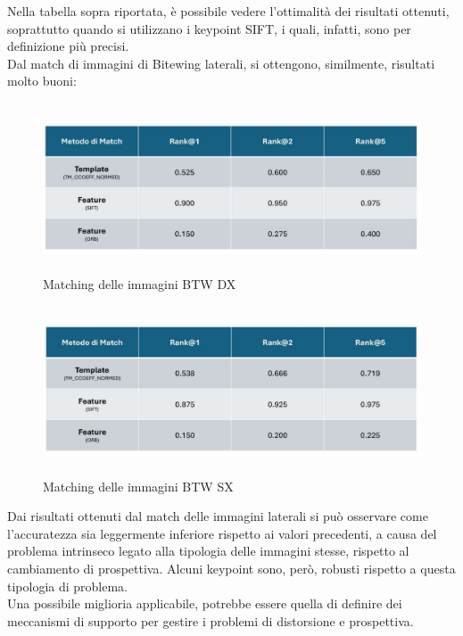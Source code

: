 \documentclass[12pt,a4paper,openright,twoside]{book}
\begin{document}
Nella tabella sopra riportata, è possibile vedere l'ottimalità dei risultati ottenuti, soprattutto quando si utilizzano i keypoint SIFT, i quali, infatti, sono per definizione più precisi. \\
Dal match di immagini di Bitewing laterali, si ottengono, similmente, risultati molto buoni:
\begin{figure}[H]
	\centering
	\includegraphics[height=5cm,width=15cm]{figures/dxprof.pdf}
    	\caption{Matching delle immagini BTW DX}
	\label{fig:dxprof}
\end{figure}
\begin{figure}[H]
	\centering
	\includegraphics[height=5cm,width=15cm]{figures/sxprof.pdf}
    	\caption{Matching delle immagini BTW SX}
	\label{fig:sxprof}
\end{figure}

Dai risultati ottenuti dal match delle immagini laterali si può osservare come l'accuratezza sia leggermente inferiore rispetto ai valori precedenti, a causa del problema intrinseco legato alla tipologia delle immagini stesse, rispetto al cambiamento di prospettiva. Alcuni keypoint sono, però, robusti rispetto a questa tipologia di problema.\\
Una possibile miglioria applicabile, potrebbe essere quella di definire dei meccanismi di supporto per gestire i problemi di distorsione e prospettiva.
\end{document}
